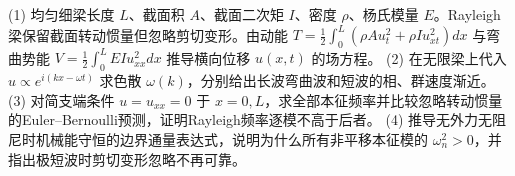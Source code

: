 (1) 均匀细梁长度 \(L\)、截面积 \(A\)、截面二次矩 \(I\)、密度 \(\rho\)、杨氏模量 \(E\)。Rayleigh梁保留截面转动惯量但忽略剪切变形。由动能 \(T=\frac12\int_0^L(\rho A u_t^2+\rho I u_{xt}^2)dx\) 与弯曲势能 \(V=\frac12\int_0^LEIu_{xx}^2dx\) 推导横向位移 \(u(x,t)\) 的场方程。
(2) 在无限梁上代入 \(u\propto e^{i(kx-\omega t)}\) 求色散 \(\omega(k)\)，分别给出长波弯曲波和短波的相、群速度渐近。
(3) 对简支端条件 \(u=u_{xx}=0\) 于 \(x=0,L\)，求全部本征频率并比较忽略转动惯量的Euler–Bernoulli预测，证明Rayleigh频率逐模不高于后者。
(4) 推导无外力无阻尼时机械能守恒的边界通量表达式，说明为什么所有非平移本征模的 \(\omega_n^2>0\)，并指出极短波时剪切变形忽略不再可靠。
